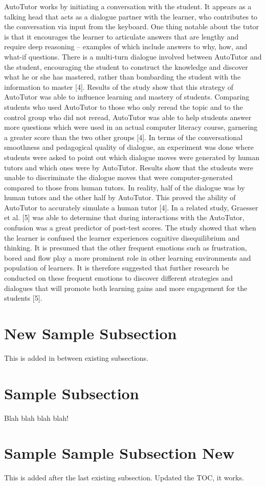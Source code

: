 AutoTutor works by initiating a conversation with the student. It appears as a talking head that acts as a dialogue partner with the learner, who contributes to the conversation via input from the keyboard. One thing notable about the tutor is that it encourages the learner to articulate answers that are lengthy and require deep reasoning – examples of which include answers to why, how, and what-if questions. There is a multi-turn dialogue involved between AutoTutor and the student, encouraging the student to construct the knowledge and discover what he or she has mastered, rather than bombarding the student with the information to master [4].
Results of the study show that this strategy of AutoTutor was able to influence learning and mastery of students. Comparing students who used AutoTutor to those who only reread the topic and to the control group who did not reread, AutoTutor was able to help students answer more questions which were used in an actual computer literacy course, garnering a greater score than the two other groups [4]. 
In terms of the conversational smoothness and pedagogical quality of dialogue, an experiment was done where students were asked to point out which dialogue moves were generated by human tutors and which ones were by AutoTutor. Results show that the students were unable to discriminate the dialogue moves that were computer-generated compared to those from human tutors. In reality, half of the dialogue was by human tutors and the other half by AutoTutor. This proved the ability of AutoTutor to accurately simulate a human tutor [4].
In a related study, Graesser et al. [5] was able to determine that during interactions with the AutoTutor, confusion was a great predictor of post-test scores. The study showed that when the learner is confused the learner experiences cognitive disequilibrium and thinking. It is presumed that the other frequent emotions such as frustration, bored and flow play a more prominent role in other learning environments and population of learners. It is therefore suggested that further research be conducted on these frequent emotions to discover different strategies and dialogues that will promote both learning gains and more engagement for the students [5].


\section {New Sample Subsection}
This is added in between existing subsections.

\section{Sample Subsection}
Blah blah blah blah!

\section{Sample Sample Subsection New}
This is added after the last existing subsection. Updated the TOC, it works.
